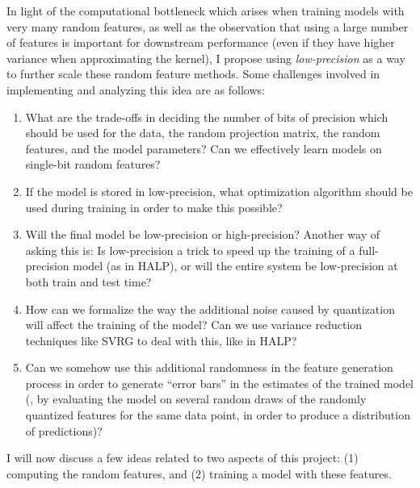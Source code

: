 \documentclass[12pt]{article}
\begin{document}
In light of the computational bottleneck which arises when training models with very many random features, as well as the observation that using a large number of features is important for downstream performance (even if they have higher variance when approximating the kernel), I propose using \textit{low-precision} as a way to further scale these random feature methods.
Some challenges involved in implementing and analyzing this idea are as follows:

\begin{enumerate}
	\item What are the trade-offs in deciding the number of bits of precision which should be used for the data, the random projection matrix, the random features, and the model parameters?  Can we effectively learn models on single-bit random features?
	\item If the model is stored in low-precision, what optimization algorithm should be used during training in order to make this possible?
	\item Will the final model be low-precision or high-precision?  Another way of asking this is: Is low-precision a trick to speed up the training of a full-precision model (as in HALP), or will the entire system be low-precision at both train and test time?
	\item How can we formalize the way the additional noise caused by quantization will affect the training of the model?  Can we use variance reduction techniques like SVRG to deal with this, like in HALP?
	\item Can we somehow use this additional randomness in the feature generation process in order to generate ``error bars'' in the estimates of the trained model (\eg, by evaluating the model on several random draws of the randomly quantized features for the same data point, in order to produce a distribution of predictions)?
\end{enumerate}

I will now discuss a few ideas related to two aspects of this project: (1) computing the random features, and (2) training a model with these features.
\end{document}
